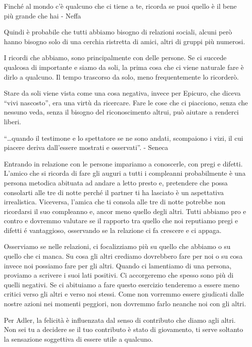 \documentclass[12pt]{book} %
\begin{document}
Finché al mondo c'è qualcuno che ci tiene a te, ricorda se puoi quello è il bene più grande che hai - Neffa

Quindi è probabile che tutti abbiamo bisogno di relazioni sociali, alcuni però hanno bisogno solo di una cerchia ristretta di amici,
altri di gruppi più numerosi.

I ricordi che abbiamo, sono principalmente con delle persone. Se ci succede qualcosa di importante e siamo da soli, la prima cosa che ci viene naturale fare è dirlo a qualcuno. Il tempo trascorso da solo, meno frequentemente lo ricorderò.

Stare da soli viene vista come una cosa negativa, invece per Epicuro, che diceva “vivi nascosto”, era una virtù da
ricercare. Fare le cose che ci piacciono, senza che nessuno veda, senza il bisogno del riconoscimento altrui, può aiutare a renderci liberi.

“…quando il testimone e lo spettatore se ne sono andati, scompaiono i vizi, il cui piacere deriva dall’essere mostrati e osservati”. - Seneca

Entrando in relazione con le persone impariamo a conoscerle, con pregi e difetti.
L'amico che si ricorda di fare gli auguri a tutti i compleanni probabilmente è una persona
metodica abituata ad andare a letto presto e, pretendere che possa consolarti alle tre di notte perché il partner ti ha
lasciato è un aspettativa irrealistica. Viceversa, l'amica che ti consola alle tre di notte
potrebbe non ricordarsi il suo compleanno e, ancor meno quello degli altri. Tutti abbiamo pro e contro e dovremmo
valutare se il rapporto tra quello che noi reputiamo pregi e difetti é vantaggioso, osservando se la relazione ci fa crescere e ci appaga.

Osserviamo se nelle relazioni, ci focalizziamo più su quello che abbiamo o su quello che ci manca. Su cosa gli altri crediamo dovrebbero fare per noi o su cosa invece noi possiamo fare per gli altri.
Quando ci lamentiamo di una persona, proviamo a scrivere i suoi lati positivi. Ci accorgeremo che spesso sono più di quelli negativi. Se ci abituiamo a fare questo esercizio tenderemo a essere meno critici verso gli altri e verso noi stessi. Come non vorremmo essere giudicati dalle nostre azioni nei momenti peggiori, non dovremmo farlo neanche noi con gli altri.

Per Adler, la felicità è influenzata dal senso di contributo che diamo agli altri. Non sei tu a decidere se il tuo contributo
è stato di giovamento, ti serve soltanto la sensazione soggettiva di essere utile a qualcuno.
\end{document}
